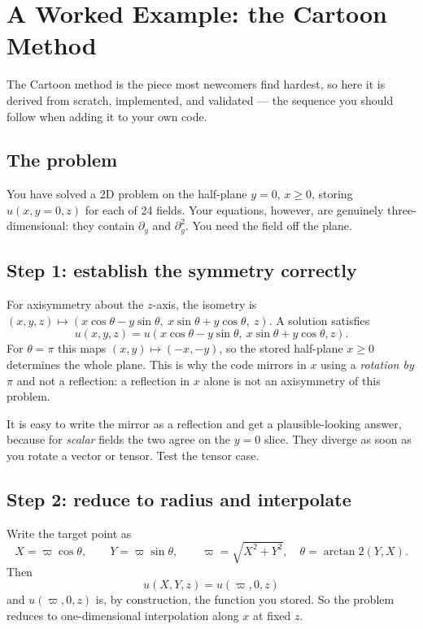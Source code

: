 \section{A Worked Example: the Cartoon Method}
\label{ch:worked}

The Cartoon method is the piece most newcomers find hardest, so here it is
derived from scratch, implemented, and validated --- the sequence you should
follow when adding it to your own code.

\subsection{The problem}

You have solved a 2D problem on the half-plane $y=0$, $x \geq 0$, storing
$u(x, y=0, z)$ for each of 24 fields. Your equations, however, are genuinely
three-dimensional: they contain $\partial_y$ and $\partial_y^2$. You need the
field off the plane.

\subsection{Step 1: establish the symmetry correctly}

For axisymmetry about the $z$-axis, the isometry is
$(x, y, z) \mapsto (x\cos\theta - y\sin\theta,\ x\sin\theta + y\cos\theta,\ z)$.
A solution satisfies
\begin{equation}
u(x, y, z) = u(x\cos\theta - y\sin\theta,\ x\sin\theta + y\cos\theta, z).
\end{equation}
For $\theta = \pi$ this maps $(x,y)\mapsto(-x,-y)$, so the stored half-plane
$x\geq 0$ determines the whole plane. This is why the code mirrors in $x$
using a \emph{rotation by $\pi$} and not a reflection: a reflection in $x$
alone is not an axisymmetry of this problem.

\gotcha
It is easy to write the mirror as a reflection and get a plausible-looking
answer, because for \emph{scalar} fields the two agree on the $y=0$ slice.
They diverge as soon as you rotate a vector or tensor. Test the tensor case.

\subsection{Step 2: reduce to radius and interpolate}

Write the target point as
\begin{equation}
X = \varpi\cos\theta, \qquad Y = \varpi\sin\theta,
\qquad \varpi = \sqrt{X^2+Y^2}, \quad \theta = \arctan2(Y,X).
\end{equation}
Then
\begin{equation}
u(X, Y, z) = u(\varpi, 0, z)
\end{equation}
and $u(\varpi, 0, z)$ is, by construction, the function you stored. So the
problem reduces to one-dimensional interpolation along $x$ at fixed $z$.

